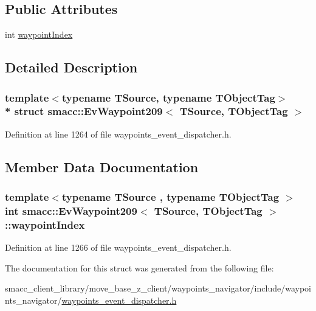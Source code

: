 \subsection*{Public Attributes}
\begin{DoxyCompactItemize}
\item 
int \hyperlink{structsmacc_1_1EvWaypoint209_a8f0fb110340f042f178e2f9cf159e7c1}{waypoint\+Index}
\end{DoxyCompactItemize}


\subsection{Detailed Description}
\subsubsection*{template$<$typename T\+Source, typename T\+Object\+Tag$>$\\*
struct smacc\+::\+Ev\+Waypoint209$<$ T\+Source, T\+Object\+Tag $>$}



Definition at line 1264 of file waypoints\+\_\+event\+\_\+dispatcher.\+h.



\subsection{Member Data Documentation}
\subsubsection[{\texorpdfstring{waypoint\+Index}{waypointIndex}}]{\setlength{\rightskip}{0pt plus 5cm}template$<$typename T\+Source , typename T\+Object\+Tag $>$ int {\bf smacc\+::\+Ev\+Waypoint209}$<$ T\+Source, T\+Object\+Tag $>$\+::waypoint\+Index}\hypertarget{structsmacc_1_1EvWaypoint209_a8f0fb110340f042f178e2f9cf159e7c1}{}\label{structsmacc_1_1EvWaypoint209_a8f0fb110340f042f178e2f9cf159e7c1}


Definition at line 1266 of file waypoints\+\_\+event\+\_\+dispatcher.\+h.



The documentation for this struct was generated from the following file\+:\begin{DoxyCompactItemize}
\item 
smacc\+\_\+client\+\_\+library/move\+\_\+base\+\_\+z\+\_\+client/waypoints\+\_\+navigator/include/waypoints\+\_\+navigator/\hyperlink{waypoints__event__dispatcher_8h}{waypoints\+\_\+event\+\_\+dispatcher.\+h}\end{DoxyCompactItemize}
